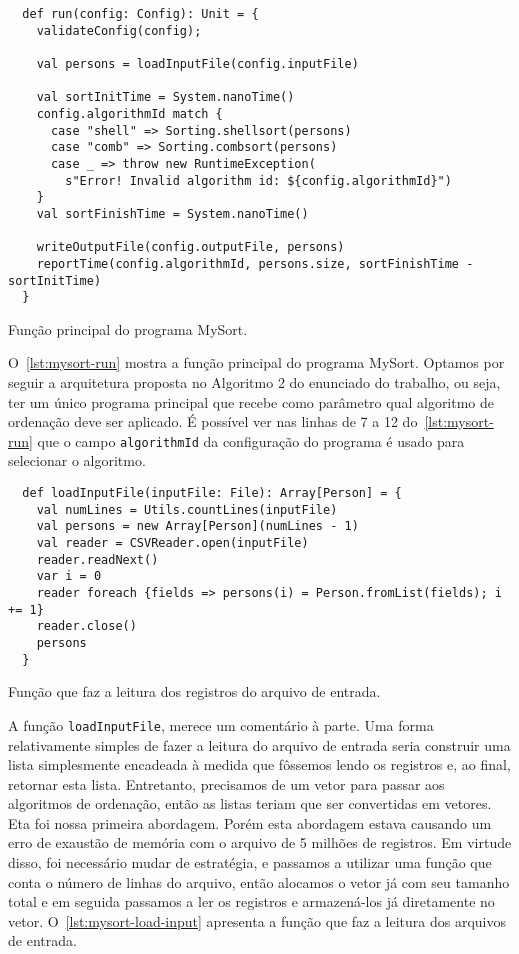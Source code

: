 \documentclass[a4paper,12pt]{scrartcl}
\begin{document}
\begin{listing}[h]
\begin{verbatim}
  def run(config: Config): Unit = {
    validateConfig(config);

    val persons = loadInputFile(config.inputFile)

    val sortInitTime = System.nanoTime()
    config.algorithmId match {
      case "shell" => Sorting.shellsort(persons)
      case "comb" => Sorting.combsort(persons)
      case _ => throw new RuntimeException(
        s"Error! Invalid algorithm id: ${config.algorithmId}")
    }
    val sortFinishTime = System.nanoTime()

    writeOutputFile(config.outputFile, persons)
    reportTime(config.algorithmId, persons.size, sortFinishTime - sortInitTime)
  }
\end{verbatim}
\caption{Função principal do programa \textsf{MySort}.}
\label{lst:mysort-run}
\end{listing}

O~\autoref{lst:mysort-run} mostra a função principal do programa
\textsf{MySort}. Optamos por seguir a arquitetura proposta no Algoritmo 2 do
enunciado do trabalho, ou seja, ter um único programa principal que recebe como
parâmetro qual algoritmo de ordenação deve ser aplicado. É possível ver nas
linhas de 7 a 12 do~\autoref{lst:mysort-run} que o campo \texttt{algorithmId} da
configuração do programa é usado para selecionar o algoritmo.

\begin{listing}[h]
\begin{verbatim}
  def loadInputFile(inputFile: File): Array[Person] = {
    val numLines = Utils.countLines(inputFile)
    val persons = new Array[Person](numLines - 1)
    val reader = CSVReader.open(inputFile)
    reader.readNext()
    var i = 0
    reader foreach {fields => persons(i) = Person.fromList(fields); i += 1}
    reader.close()
    persons
  }
\end{verbatim}
\caption{Função que faz a leitura dos registros do arquivo de entrada.}
\label{lst:mysort-load-input}
\end{listing}

A função \texttt{loadInputFile}, merece um comentário à parte. Uma
forma relativamente simples de fazer a leitura do arquivo de entrada seria
construir uma lista simplesmente encadeada à medida que fôssemos lendo os
registros e, ao final, retornar esta lista. Entretanto, precisamos de um vetor
para passar aos algoritmos de ordenação, então as listas teriam que ser
convertidas em vetores. Eta foi nossa primeira abordagem. Porém esta abordagem
estava causando um erro de exaustão de memória com o arquivo de 5 milhões de
registros. Em virtude disso, foi necessário mudar de estratégia, e passamos a
utilizar uma função que conta o número de linhas do arquivo, então alocamos o
vetor já com seu tamanho total e em seguida passamos a ler os registros e
armazená-los já diretamente no vetor. O~\autoref{lst:mysort-load-input}
apresenta a função que faz a leitura dos arquivos de entrada.
\end{document}
